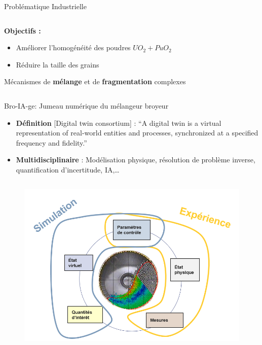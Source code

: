 \documentclass[aspectratio=169]{beamer} %
\begin{document}
\begin{frame}{Problématique Industrielle}
\begin{columns}[t]
\begin{column}{0.5\textwidth}
\begin{figure}
            \end{figure}
            \textbf{Objectifs :}
            \begin{itemize}
                \item Améliorer l'homogénéité des poudres $UO_2 + PuO_2$
                \item Réduire la taille des grains
            \end{itemize}
            Mécanismes de \textbf{mélange} et de \textbf{fragmentation} complexes
        \end{column}
    \end{columns}
\end{frame}

\begin{frame}{Bro-IA-ge: Jumeau numérique du mélangeur broyeur}
    \begin{itemize}
        \item \textbf{Définition} [Digital twin consortium] : “A digital twin is a virtual representation of real-world entities and processes, synchronized at a specified frequency and fidelity.”
        \item \textbf{Multidisciplinaire} : Modélisation physique, résolution de problème inverse, quantification d’incertitude, IA,\dots
    \end{itemize}
    \vspace{-0.5cm}
    \begin{columns}[t]
        \begin{column}{0.45\textwidth}
            \begin{figure}
                \includegraphics[width=1.1\textwidth]{./images/Jumeau_numerique.png}

\end{figure}
\end{column}
\end{columns}
\end{frame}
\end{document}
